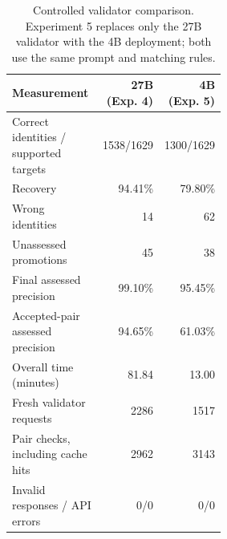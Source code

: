 \begin{table}[htbp]
\caption{Controlled validator comparison. Experiment 5 replaces only the 27B validator with the 4B deployment; both use the same prompt and matching rules.}
\label{tab:exp5-model-comparison}
\centering\small
\begin{tabular}{p{0.53\linewidth}rr}
\toprule
Measurement & 27B (Exp. 4) & 4B (Exp. 5)\\
\midrule
Correct identities / supported targets & 1538/1629 & 1300/1629\\
Recovery & 94.41\% & 79.80\%\\
Wrong identities & 14 & 62\\
Unassessed promotions & 45 & 38\\
Final assessed precision & 99.10\% & 95.45\%\\
Accepted-pair assessed precision & 94.65\% & 61.03\%\\
Overall time (minutes) & 81.84 & 13.00\\
Fresh validator requests & 2286 & 1517\\
Pair checks, including cache hits & 2962 & 3143\\
Invalid responses / API errors & 0/0 & 0/0\\
\bottomrule
\end{tabular}
\end{table}
